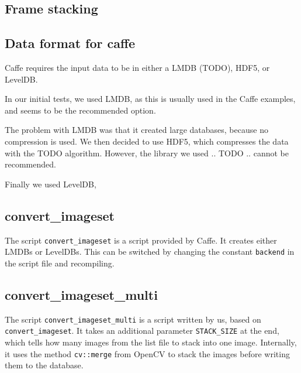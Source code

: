 \subsection{Frame stacking}


\subsection{Data format for caffe}
Caffe requires the input data to be in either a LMDB (TODO), HDF5, or LevelDB.

In our initial tests, we used LMDB, as this is usually used in the Caffe examples, and seems to be the recommended option.

The problem with LMDB was that it created large databases, because no compression is used.
We then decided to use HDF5, which compresses the data with the TODO algorithm.
However, the library we used .. TODO .. cannot be recommended.

Finally we used LevelDB,




\subsection{convert\_imageset}
The script \texttt{convert\_imageset} is a script provided by Caffe.
It creates either LMDBs or LevelDBs.
This can be switched by changing the constant \texttt{backend} in the script file and recompiling.

\subsection{convert\_imageset\_multi}
The script \texttt{convert\_imageset\_multi} is a script written by us, based on \texttt{convert\_imageset}.
It takes an additional parameter \texttt{STACK\_SIZE} at the end, which tells how many images from the list file to stack into one image.
Internally, it uses the method \texttt{cv::merge} from OpenCV to stack the images before writing them to the database.
